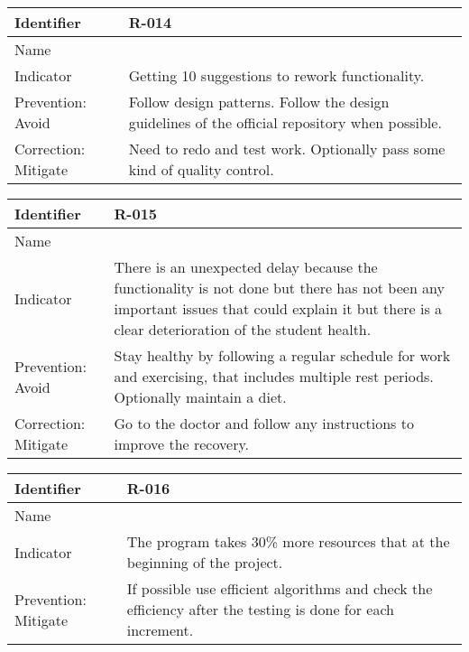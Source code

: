 \begin{table}[H]
	\begin{tabularx}{\textwidth}{|y|z|}
		\hline
		Identifier & \textbf{R-014} \\ \hline
		Name & \Rcatorce \\ \hline
		Indicator & Getting 10 suggestions to rework functionality.\\ \hline
		Prevention: Avoid
			& Follow design patterns. \linej
			 Follow the design guidelines of the official repository when possible.\\ \hline
		Correction: Mitigate
			& Need to redo and test work. \linej
			 Optionally pass some kind of quality control. \\ \hline
	\end{tabularx}
\end{table}

\begin{table}[H]
	\begin{tabularx}{\textwidth}{|y|z|}
		\hline
		Identifier & \textbf{R-015} \\ \hline
		Name & \Rquince \\ \hline
		Indicator & There is an unexpected delay because the functionality is not done but there has not been any important issues that could explain it but there is a clear deterioration of the student health. \\ \hline
		Prevention: Avoid
			& Stay healthy by following a regular schedule for work and exercising, that includes multiple rest periods. \linej
			 Optionally maintain a diet.\\ \hline
		Correction: Mitigate
			& Go to the doctor and follow any instructions to improve the recovery.\\ \hline
	\end{tabularx}
\end{table}

\begin{table}[H]
	\begin{tabularx}{\textwidth}{|y|z|}
		\hline
		Identifier & \textbf{R-016} \\ \hline
		Name & \Rdieciseis \\ \hline
		Indicator & The program takes 30\% more resources that at the beginning of the project.\\ \hline
		Prevention: Mitigate
			& If possible use efficient algorithms and check the efficiency after the testing is done for each increment.\\ \hline
	\end{tabularx}
\end{table}

